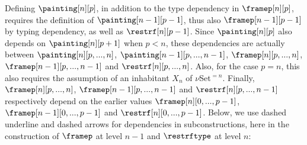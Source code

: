 \documentclass{msc}
\newcommand{\udensdash}[1]{%
    \tikz[baseline=(todotted.base)]{
        \node[inner sep=1pt,outer sep=0pt] (todotted) {$#1$};
        \draw[densely dashed] (todotted.south west) -- (todotted.south east);
    }%
}%
\begin{document}
Defining $\painting[n][p]$, in addition to the type dependency in $\framep[n][p]$, requires the definition of $\painting[n-1][p-1]$, thus also $\framep[n-1][p-1]$ by typing dependency, as well as $\restrf[n][p-1]$. Since $\painting[n][p]$ also depends on $\painting[n][p+1]$ when $p<n$, these dependencies are actually between $\painting[n][p,...,n]$, $\painting[n-1][p,...,n-1]$, $\framep[n][p,...,n]$, $\framep[n-1][p,...,n-1]$ and $\restrf[n][p,...,n]$. Also, for the case $p=n$, this also requires the assumption of an inhabitant $X_{n}$ of $\nu$Set$^{=n}$. Finally, $\framep[n][p,...,n]$, $\framep[n-1][p,...,n-1]$ and $\restrf[n][p,...,n-1]$ respectively depend on the earlier values $\framep[n][0,...,p-1]$, $\framep[n-1][0,...,p-1]$ and $\restrf[n][0,...,p-1]$.  Below, we use dashed underline and dashed arrows for dependencies in subconstructions, here in the construction of $\framep$ at level $n-1$ and $\restrftype$ at level $n$:
\begin{center}
  \fontsize{7.2}{9}\selectfont
\end{center}
\end{document}
